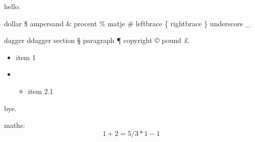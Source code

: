 


hello.

dollar \$
ampersand \&
procent \%
matje \#
leftbrace \{
rightbrace \}
underscore \_

dagger \dag
ddagger \ddag
section \S
paragraph \P
copyright \copyright
pound \pounds

\begin{itemize}
\item item 1
\item \begin{itemize}
      \item item 2.1
      \end{itemize}
\end{itemize}
bye.

maths: \[ 1 + 2 = 5 / 3 * 1 - 1 \]





